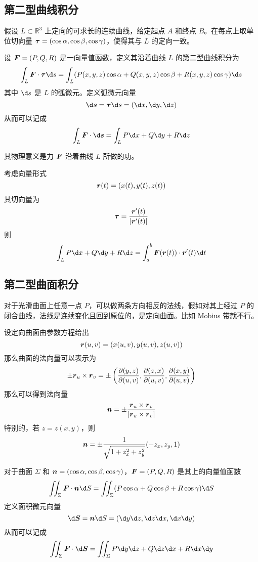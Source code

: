 \subsection{第二型曲线积分}

假设 $L \subset \mathbb{R}^3$ 上定向的可求长的连续曲线，给定起点 $A$ 和终点 $B$。在每点上取单位切向量 $\boldsymbol{\tau} = (\cos \alpha, \cos \beta, \cos \gamma)$，使得其与 $L$ 的定向一致。

\begin{definition}
	设 $\boldsymbol{F} = (P, Q, R)$ 是一向量值函数，定义其沿着曲线 $L$ 的第二型曲线积分为
	\[ \int_L \vbf{F} \cdot \vbf{\tau} \d s = \int_L (P(x,y,z) \cos \alpha + Q(x, y, z) \cos \beta + R(x, y, z) \cos \gamma) \d s \]
	其中 $\d s$ 是 $L$ 的弧微元。定义弧微元向量
	\[ \d \vbf{s} = \vbf{\tau} \d s = (\d x, \d y, \d z) \]
	从而可以记成
	\[ \int_L \vbf{F} \cdot \d \vbf{s} = \int_L P \d x + Q \d y + R \d z \]
\end{definition}

其物理意义是力 $\boldsymbol{F}$ 沿着曲线 $L$ 所做的功。

考虑向量形式
\[ \boldsymbol{r}(t) = (x(t), y(t), z(t)) \]
其切向量为
\[ \boldsymbol{\tau} = \frac{\boldsymbol{r}'(t)}{|\boldsymbol{r}'(t)|} \]
则
\[ \int_L P \d x + Q \d y + R \d z = \int_a^b \vbf{F}(\vbf{r}(t)) \cdot \vbf{r}'(t) \d t \]

\subsection{第二型曲面积分}

对于光滑曲面上任意一点 $P$，可以做两条方向相反的法线，假如对其上经过 $P$ 的闭合曲线，法线是连续变化且回到原位的，是定向曲面。比如 Mobius 带就不行。

设定向曲面由参数方程给出
\[ \boldsymbol{r}(u, v) = (x(u, v), y(u, v), z(u, v)) \]
那么曲面的法向量可以表示为
\[ \pm \boldsymbol{r}_u \times \boldsymbol{r}_v = \pm \left( \frac{\partial(y, z)}{\partial (u, v)},\frac{\partial(z, x)}{\partial (u, v)},\frac{\partial(x, y)}{\partial (u, v)}  \right) \]
那么可以得到法向量
\[ \boldsymbol{n} = \pm \frac{\boldsymbol{r}_u \times \boldsymbol{r}_v}{|\boldsymbol{r}_u \times \boldsymbol{r}_v|} \]
特别的，若 $z = z(x, y)$，则
\[ \boldsymbol{n} = \pm \frac{1}{\sqrt{1 + z_x^2 + z_y^2}} (-z_x, z_y, 1) \]

\begin{definition}
	对于曲面 $\Sigma$ 和 $\boldsymbol{n} = (\cos \alpha, \cos \beta, \cos \gamma)$，$\boldsymbol{F} = (P, Q, R)$ 是其上的向量值函数
	\[ \iint_{\Sigma} \vbf{F} \cdot \vbf{n} \d S = \iint_{\Sigma} (P \cos \alpha + Q \cos \beta + R \cos \gamma) \d S \]
	定义面积微元向量
	\[ \d \vbf{S} = \vbf{n} \d S = (\d y \d z, \d z \d x, \d x \d y) \]
	从而可以记成
	\[ \iint_\Sigma \vbf{F} \cdot \d \vbf{S} = \iint_{\Sigma} P \d y \d z + Q \d z \d x + R \d x \d y \]
\end{definition}

